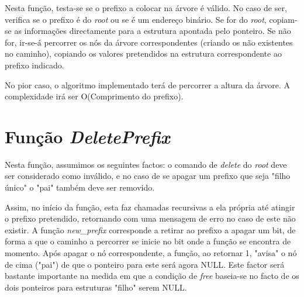 \documentclass[twocolumn]{article}
\begin{document}
Nesta função, testa-se se o prefixo a colocar na árvore é válido. No caso de ser, verifica se o prefixo é do \textit{root} ou se é um endereço binário. Se for do \textit{root}, copiam-se as informações directamente para a estrutura apontada pelo ponteiro. Se não for, ir-se-á percorrer os nós da árvore correspondentes (criando os não existentes no caminho), copiando os valores pretendidos na estrutura correspondente ao prefixo indicado.

No pior caso, o algoritmo implementado terá de percorrer a altura da árvore. A complexidade irá ser O(Comprimento do prefixo).

\begin{algorithmic}
 \If{$adress\_is\_invalid$}{
 	\Return\;
 \EndIf
 \If{$adress\_is\_"*"$}{\Comment{root prefix}
 	\State $root->next\_hop:=next\_hop\;$
 	
 	\State $root->prefix:=prefix\;$
 \Else
    \State $auxiliar\_node:=root\_node\;$
 	\While{$all\_prefix\_nodes\_havent\_been\_visited\_yet$}{
 		\If{$bit\_is\_0$}{
 			\If{$there\_is\_no\_node$}
 				\State $node\_creation()\;$
 			\EndIf
 			\State $auxiliar:=auxiliar->zero\;$
 		\Else \Comment{bit is one} 			
 			\If{$there\_is\_no\_node$}
 				\State $node\_creation()\;$
 			\EndIf
 			\State $auxiliar:=auxiliar->one\;$
 		\EndIf
		\State $auxiliar->next\_hop:=next\_hop\;$ 	
 	\EndWhile
 \EndIf
 \caption{AddPrefix}
\end{algorithmic}

\section{Função \textit{DeletePrefix}}
Nesta função, assumimos os seguintes factos: o comando de \textit{delete} do \textit{root} deve ser considerado como inválido, e no caso de se apagar um prefixo que seja "filho único" o "pai" também deve ser removido.

Assim, no início da função, esta faz chamadas recursivas a ela própria até atingir o prefixo pretendido, retornando com uma mensagem de erro no caso de este não existir.
 A função \textit{new\_prefix} corresponde a retirar ao prefixo a apagar um bit, de forma a que o caminho a percorrer se inicie no bit onde a função se encontra de momento.%
  Após apagar o nó correspondente, a função, ao retornar 1, "avisa" o nó de cima ("pai") de que o ponteiro para este será agora NULL. Este factor será bastante importante na medida em que a condição de \textit{free} baseia-se no facto de os dois ponteiros para estruturas "filho" serem NULL.
\end{document}
